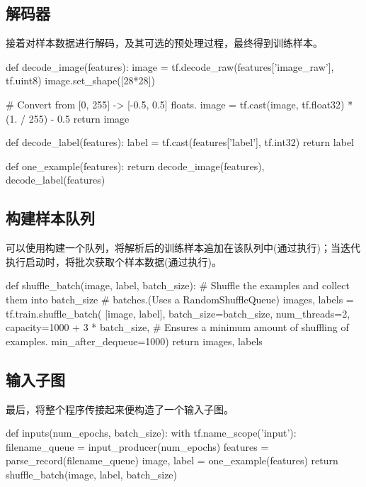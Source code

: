 \begin{content}
\subsection{解码器}

接着对样本数据进行解码，及其可选的预处理过程，最终得到训练样本。

\begin{leftbar}
\begin{python}
def decode_image(features):
  image = tf.decode_raw(features['image_raw'], tf.uint8)
  image.set_shape([28*28])

  # Convert from [0, 255] -> [-0.5, 0.5] floats.
  image = tf.cast(image, tf.float32) * (1. / 255) - 0.5
  return image

def decode_label(features):
  label = tf.cast(features['label'], tf.int32)
  return label

def one_example(features):
  return decode_image(features), decode_label(features)
\end{python}
\end{leftbar}

\subsection{构建样本队列}

可以使用构建一个队列，将解析后的训练样本追加在该队列中(通过执行)；当迭代执行启动时，将批次获取个样本数据(通过执行)。

\begin{leftbar}
\begin{python}
def shuffle_batch(image, label, batch_size):
    # Shuffle the examples and collect them into batch\_size
    # batches.(Uses a RandomShuffleQueue)
    images, labels = tf.train.shuffle_batch(
      [image, label], batch_size=batch_size, num_threads=2,
      capacity=1000 + 3 * batch_size,
      # Ensures a minimum amount of shuffling of examples.
      min_after_dequeue=1000)
    return images, labels
\end{python}
\end{leftbar}

\subsection{输入子图}

最后，将整个程序传接起来便构造了一个输入子图。

\begin{leftbar}
\begin{python}
def inputs(num_epochs, batch_size):
  with tf.name_scope('input'):
    filename_queue = input_producer(num_epochs)
    features = parse_record(filename_queue)
    image, label = one_example(features)
    return shuffle_batch(image, label, batch_size)
\end{python}
\end{leftbar}

\end{content}

